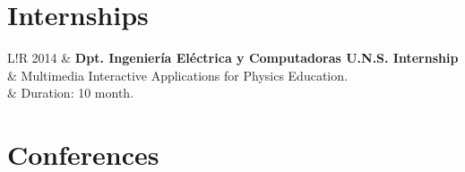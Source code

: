 \documentclass[10pt]{article}
\newcommand\VRule{\color{lightgray}\vrule width 0.5pt}
\begin{document}
\section{Internships}
\begin{tabular}{L!{\VRule}R}
2014 & {\bf Dpt. Ingeniería Eléctrica y Computadoras U.N.S. Internship} \\
	 & Multimedia Interactive Applications for Physics Education. \\
	 & Duration: 10 month. \\
\end{tabular}

\newpage

\section{Conferences}
\end{document}
